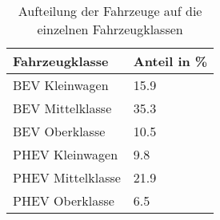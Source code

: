 {
\renewcommand{\arraystretch}{1.2}%
\begin{table}[H]
	\begin{center}
		\caption{Aufteilung der Fahrzeuge auf die einzelnen Fahrzeugklassen}
		\begin{tabu} to 0.5\textwidth {X[1] X[1, r]}
			\toprule
			Fahrzeugklasse    & Anteil in \si{\percent}  \\ \midrule
			BEV Kleinwagen    & \num{15.9}               \\
			BEV Mittelklasse  & \num{35.3}               \\
			BEV Oberklasse    & \num{10.5}               \\
			PHEV Kleinwagen   & \num{9.8}                \\
			PHEV Mittelklasse & \num{21.9}               \\
			PHEV Oberklasse   & \num{6.5}                \\ \bottomrule
		\end{tabu}
		\label{tab:CarSplit}
	\end{center}
	\vspace{-3mm}%
\end{table}
}